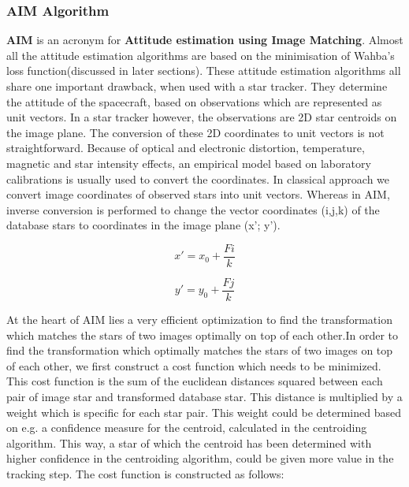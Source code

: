 {{\subsubsection{AIM Algorithm} %
\label{sec:AIM}
{
 \textbf{AIM} is an acronym for \textbf{Attitude estimation using Image Matching}.
Almost all the attitude estimation algorithms are based on the minimisation of Wahba's loss function(discussed in later sections). These attitude estimation algorithms all share one important drawback, when used with a star tracker. They
determine the attitude of the spacecraft, based on observations which are represented as unit vectors. In a
star tracker however, the observations are 2D star centroids on the image plane. The conversion of these 2D
coordinates to unit vectors is not straightforward. Because of optical and electronic distortion, temperature,
magnetic and star intensity effects, an empirical model based on laboratory calibrations is usually used
to convert the coordinates.\newline
In classical approach we convert image coordinates of observed stars into unit vectors. Whereas in AIM, inverse conversion is performed to change the vector coordinates (i,j,k) of the
database stars to coordinates in the image plane (x'; y').

\begin{equation}
    x'= x_{0} + \frac{Fi}{k}
\end{equation}

\begin{equation}
y'= y_{0} + \frac{Fj}{k}
\end{equation}

At the heart of AIM lies a very efficient optimization to find the transformation which matches the stars of two
images optimally on top of each other.In order to find the transformation which optimally matches the stars of two images on top of each other, we
first construct a cost function which needs to be minimized.
This cost function is the sum of the euclidean
distances squared between each pair of image star and transformed database star. This distance is multiplied
by a weight which is specific for each star pair. This weight could be determined based on e.g. a confidence
measure for the centroid, calculated in the centroiding algorithm. This way, a star of which the centroid
has been determined with higher confidence in the centroiding algorithm, could be given more value in the
tracking step. The cost function is constructed as follows:

}}}
